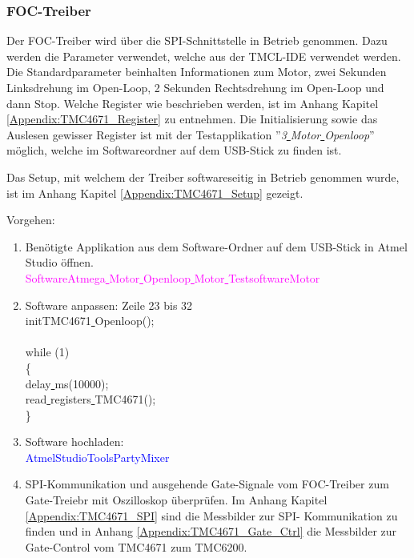 \subsubsection{FOC-Treiber}
\label{subsubsec:Inbetriebnahme_FOC_Treiber}

Der FOC-Treiber wird über die SPI-Schnittstelle in Betrieb genommen. Dazu werden die Parameter verwendet, welche aus der TMCL-IDE verwendet werden. Die Standardparameter beinhalten Informationen zum Motor, zwei Sekunden Linksdrehung im Open-Loop, 2 Sekunden Rechtsdrehung im Open-Loop und dann Stop. Welche Register wie beschrieben werden, ist im Anhang Kapitel \ref{Appendix:TMC4671_Register} zu entnehmen. Die Initialisierung sowie das Auslesen gewisser Register ist mit der Testapplikation ''\textit{3\underline{ }Motor\underline{ }Openloop}'' möglich, welche im Softwareordner auf dem USB-Stick zu finden ist.

Das Setup, mit welchem der Treiber softwareseitig in Betrieb genommen wurde, ist im Anhang Kapitel \ref{Appendix:TMC4671_Setup} gezeigt.

Vorgehen:
\begin{enumerate}
\item Benötigte Applikation aus dem Software-Ordner auf dem USB-Stick in Atmel Studio öffnen.\\
\textcolor{magenta}{Software\textrightarrow Atmega\underline{ }Motor\underline{ }Openloop\underline{ }Motor\underline{ }Testsoftware\textrightarrow Motor}\\

\item Software anpassen: Zeile 23 bis 32\\
\textcolor{OliveGreen}{
	initTMC4671\underline{ }Openloop();\\
\\
    while (1) \\
    \{\\
		\underline{ }delay\underline{ }ms(10000);\\
		read\underline{ }registers\underline{ }TMC4671();\\
    \}
}\\

\item Software hochladen:\\
\textcolor{blue}{AtmelStudio\textrightarrow Tools\textrightarrow PartyMixer}\\

\item SPI-Kommunikation und ausgehende Gate-Signale vom FOC-Treiber zum Gate-Treiebr mit Oszilloskop überprüfen. Im Anhang Kapitel \ref{Appendix:TMC4671_SPI} sind die Messbilder zur SPI- Kommunikation zu finden und in Anhang \ref{Appendix:TMC4671_Gate_Ctrl} die Messbilder zur Gate-Control vom TMC4671 zum TMC6200.
\end{enumerate}